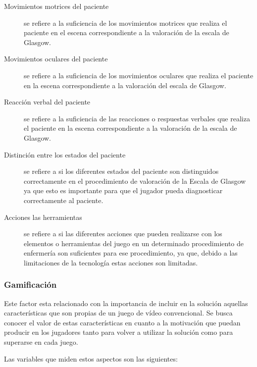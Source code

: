 \begin{description}

\item [Movimientos motrices del paciente] se refiere a la suficiencia de los
    movimientos motrices que realiza el paciente en el escena correspondiente a
    la valoración de la escala de Glasgow.

\item [Movimientos oculares del paciente] se refiere a la suficiencia de los
    movimientos oculares que realiza el paciente en la escena correspondiente a
    la valoración del escala de Glasgow.

\item [Reacción verbal del paciente] se refiere a la suficiencia de las
    reacciones o respuestas verbales que realiza el paciente en la escena
    correspondiente a la valoración de la escala de Glasgow.

\item[Distinción entre los estados del paciente] se refiere a si los diferentes
    estados del paciente son distinguidos correctamente en el procedimiento de
    valoración de la Escala de Glasgow ya que esto es importante para que el
    jugador pueda diagnosticar correctamente al paciente.

\item[Acciones las herramientas] se refiere a si las diferentes acciones que
    pueden realizarse con los elementos o herramientas del juego en un
    determinado procedimiento de enfermería son suficientes para ese
    procedimiento, ya que, debido a las limitaciones de la tecnología estas
    acciones son limitadas.

\end{description}

\subsubsection{Gamificación}
\label{sec:sub_gamificacion}

Este factor esta relacionado con la importancia de incluir en la solución
aquellas características que son propias de un juego de vídeo convencional. Se
busca conocer el valor de estas características en cuanto a la motivación que
puedan producir en los jugadores tanto para volver a utilizar la solución como
para superarse en cada juego.

Las variables que miden estos aspectos son las siguientes:

